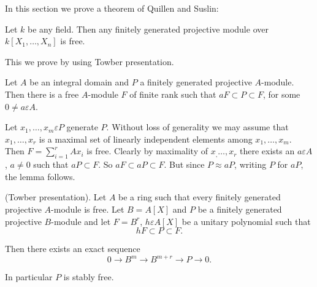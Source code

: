 In this section we prove a theorem of Quillen and Suslin:

Let $k$ be any field. Then any finitely generated projective module
over $k[X_1,\ldots,X_n]$ is free.

This we prove by using Towber presentation.


\begin{lem}\label{c4:lem2.1}
Let $A$ be an integral domain and $P$ a finitely generated projective
$A$-module. Then there is a free $A$-module $F$ of finite rank such
that $aF\subset P\subset F$, for some $0\neq a\varepsilon A$. 
\end{lem}

\begin{Proof}
Let $x_1,\ldots,x_m\varepsilon P$ generate $P$. Without loss of
generality we may assume that $x_1,\ldots, x_r$ is a maximal set of
linearly independent elements among $x_1,\ldots,x_m$. Then
$F=\sum\limits_{i=1}^{r} Ax_i$ is free. Clearly by maximality of
$x_,\ldots,x_r$ there exists an $a\varepsilon A$, $a\neq 0$ such that
$aP\subset F$. So $aF\subset aP\subset F$. But since $P\approx aP$,
writing $P$ for $aP$, the lemma follows. 
\enprf
\end{Proof}

\begin{Prop}\label{c4:Prop2.2}
(Towber presentation). Let $A$ be a ring such that every finitely
generated projective $A$-module is free. Let $B=A[X]$ and $P$ be a
finitely generated projective $B$-module and let $F=B^{r}$,
$h\varepsilon A[X]$ be a unitary polynomial such that 
$$
hF\subset P \subset F.
$$

Then there exists an exact sequence
$$
0\rightarrow B^{m}\rightarrow B^{m+r}\rightarrow P\rightarrow 0.
$$

In particular $P$ is stably free.
\end{Prop}

